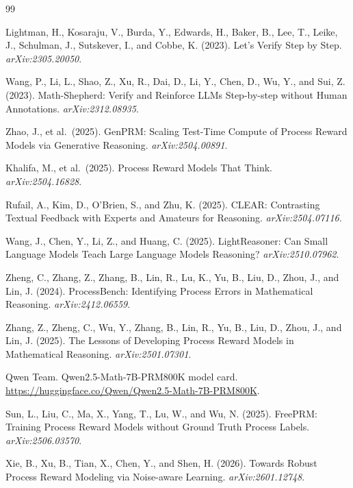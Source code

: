 \documentclass[11pt]{article}
\begin{document}
\begin{thebibliography}{99}

 Lightman, H., Kosaraju, V., Burda, Y., Edwards,
H., Baker, B., Lee, T., Leike, J., Schulman, J., Sutskever, I., and Cobbe, K.
(2023). Let's Verify Step by Step. \emph{arXiv:2305.20050}.

 Wang, P., Li, L., Shao, Z., Xu, R., Dai, D.,
Li, Y., Chen, D., Wu, Y., and Sui, Z. (2023). Math-Shepherd: Verify and
Reinforce LLMs Step-by-step without Human Annotations. \emph{arXiv:2312.08935}.

 Zhao, J., et al.\ (2025). GenPRM: Scaling
Test-Time Compute of Process Reward Models via Generative Reasoning.
\emph{arXiv:2504.00891}.

 Khalifa, M., et al.\ (2025). Process Reward
Models That Think. \emph{arXiv:2504.16828}.

 Rufail, A., Kim, D., O'Brien, S., and Zhu, K.
(2025). CLEAR: Contrasting Textual Feedback with Experts and Amateurs for
Reasoning. \emph{arXiv:2504.07116}.

 Wang, J., Chen, Y., Li, Z., and Huang, C.
(2025). LightReasoner: Can Small Language Models Teach Large Language
Models Reasoning? \emph{arXiv:2510.07962}.

 Zheng, C., Zhang, Z., Zhang, B., Lin, R.,
Lu, K., Yu, B., Liu, D., Zhou, J., and Lin, J. (2024). ProcessBench:
Identifying Process Errors in Mathematical Reasoning. \emph{arXiv:2412.06559}.

 Zhang, Z., Zheng, C., Wu, Y., Zhang, B.,
Lin, R., Yu, B., Liu, D., Zhou, J., and Lin, J. (2025). The Lessons of
Developing Process Reward Models in Mathematical Reasoning.
\emph{arXiv:2501.07301}.

 Qwen Team. Qwen2.5-Math-7B-PRM800K model card.
\url{https://huggingface.co/Qwen/Qwen2.5-Math-7B-PRM800K}.

 Sun, L., Liu, C., Ma, X., Yang, T., Lu, W., and
Wu, N. (2025). FreePRM: Training Process Reward Models without Ground
Truth Process Labels. \emph{arXiv:2506.03570}.

 Xie, B., Xu, B., Tian, X., Chen, Y., and Shen,
H. (2026). Towards Robust Process Reward Modeling via Noise-aware Learning.
\emph{arXiv:2601.12748}.


\end{thebibliography}
\end{document}
